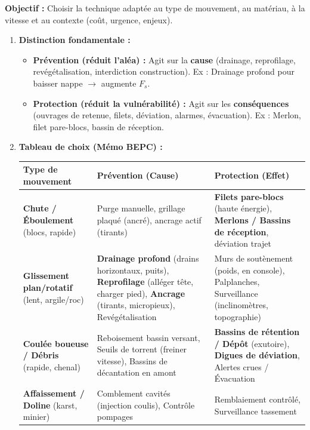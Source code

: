 \documentclass[11pt]{article}
\begin{document}
\begin{methode}
    \textbf{Objectif :} Choisir la technique adaptée au type de mouvement, au matériau, à la vitesse et au contexte (coût, urgence, enjeux).
    \begin{enumerate}
        \item \textbf{Distinction fondamentale :}
            \begin{itemize}
                \item \textbf{Prévention (réduit l'aléa) :} Agit sur la \textbf{cause} (drainage, reprofilage, revégétalisation, interdiction construction). Ex : Drainage profond pour baisser nappe $\rightarrow$ augmente $F_s$.
                \item \textbf{Protection (réduit la vulnérabilité) :} Agit sur les \textbf{conséquences} (ouvrages de retenue, filets, déviation, alarmes, évacuation). Ex : Merlon, filet pare-blocs, bassin de réception.
            \end{itemize}
        \item \textbf{Tableau de choix (Mémo BEPC) :}
            \begin{center}
                \begin{tabularx}{\linewidth}{|l|X|X|}\hline
                \rowcolor{popblueL} \textbf{Type de mouvement} & \textbf{Prévention (Cause)} & \textbf{Protection (Effet)} \\ \hline
                \textbf{Chute / Éboulement} (blocs, rapide) & Purge manuelle, grillage plaqué (ancré), ancrage actif (tirants) & \textbf{Filets pare-blocs} (haute énergie), \textbf{Merlons / Bassins de réception}, déviation trajet \\ \hline
                \textbf{Glissement plan/rotatif} (lent, argile/roc) & \textbf{Drainage profond} (drains horizontaux, puits), \textbf{Reprofilage} (alléger tête, charger pied), \textbf{Ancrage} (tirants, micropieux), Revégétalisation & Murs de soutènement (poids, en console), Palplanches, Surveillance (inclinomètres, topographie) \\ \hline
                \textbf{Coulée boueuse / Débris} (rapide, chenal) & Reboisement bassin versant, Seuils de torrent (freiner vitesse), Bassins de décantation en amont & \textbf{Bassins de rétention / Dépôt} (exutoire), \textbf{Digues de déviation}, Alertes crues / Évacuation \\ \hline
                \textbf{Affaissement / Doline} (karst, minier) & Comblement cavités (injection coulis), Contrôle pompages & Remblaiement contrôlé, Surveillance tassement \\ \hline

\end{tabularx}
\end{center}
\end{enumerate}
\end{methode}
\end{document}
